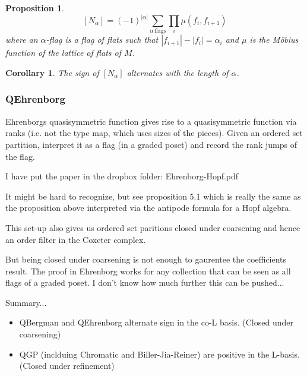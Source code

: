 \documentclass[12pt]{amsart}
\newtheorem{proposition}[definition]{Proposition}
\newtheorem{corollary}[definition]{Corollary}
\begin{document}
\begin{proposition}
$$[N_{\alpha}] = (-1)^{|\alpha|} \sum_{\alpha \, \textrm{flags}} \prod_i \mu(f_i,f_{i+1})$$
where an $\alpha$-flag is a flag of flats such that $|f_{i+1}| - |f_i| = \alpha_i$ and $\mu$ is the M\"{o}bius function of the lattice of flats of $M$.
\end{proposition}

\begin{corollary}
The sign of $[N_{\alpha}]$ alternates with the length of $\alpha$.  

\end{corollary}



\subsubsection{QEhrenborg}

Ehrenborgs quasisymmetric function gives rise to a quasisymmetric function via ranks (i.e. not the type map, which uses sizes of the pieces).  Given an ordered set partition, interpret it as a flag (in a graded poset) and record the rank jumps of the flag.  

I have put the paper in the dropbox folder: Ehrenborg-Hopf.pdf  

It might be hard to recognize, but see proposition 5.1 which is really the same as the proposition above interpreted via the antipode formula for a Hopf algebra. 

This set-up also gives us ordered set paritions closed under coarsening and hence an order filter in the Coxeter complex. 

But being closed under coarsening is not enough to gaurentee the coefficients result.  The proof in Ehrenborg works for any collection that can be seen as all flags of a graded poset.  I don't know how much further this can be pushed...  


Summary...

\begin{itemize}

\item QBergman and QEhrenborg alternate sign in the co-L basis.  (Closed under coarsening)

\item QGP (inclduing Chromatic and Biller-Jia-Reiner) are positive in the L-basis.  (Closed under refinement)

\end{itemize}
\end{document}

